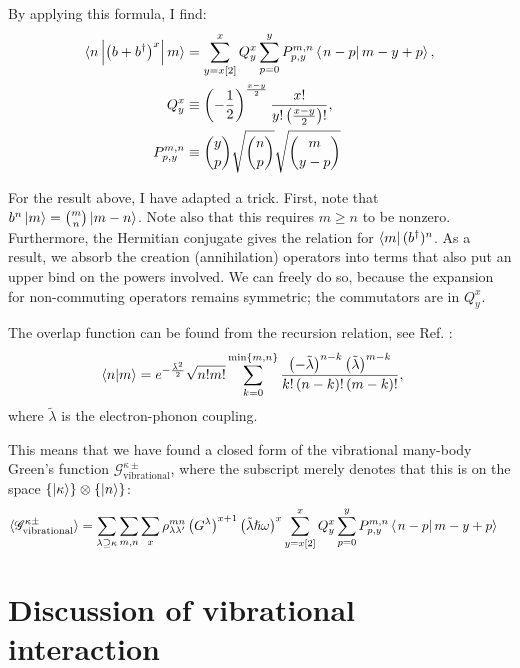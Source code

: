 By applying this formula, I find:
\begin{align*}
\braket{n \left| \left(b+b^\dagger\right)^x \right| m}&= \sum_{y=x[2]}^x Q^x_y \sum_{p=0}^{y} P^{m,n}_{p,y} \braket{\left. n-p \right| m-y+p}, \\
Q^x_y&\equiv \left(-\frac{1}{2}\right)^{\frac{x-y}{2}} \frac{ x! }{ y! \left(\frac{x-y}{2}\right)!},\\
P_{p,y}^{m,n} &\equiv \binom{y}{p} \sqrt{ \binom{n}{p}} \sqrt{\binom{m}{y-p}}
\end{align*}

For the result above, I have adapted a trick. First, note that $b^n \ket{m} = \binom{m}{n} \ket{m-n}$. Note also that this requires $m\geq n$ to be nonzero. Furthermore, the Hermitian conjugate gives the relation for $\bra{m} (b^\dagger)^n$. As a result, we absorb the creation (annihilation) operators into terms that also put an upper bind on the powers involved. We can freely do so, because the expansion for non-commuting operators remains symmetric; the commutators are in $Q^x_y$. 


The overlap function can be found from the recursion relation, see Ref. \cite{kaspermothpoulsen}:
\begin{align*}
\braket{n|m} &= e^{-\frac{\tilde{\lambda}^2}{2}} \sqrt{n! m!} \sum_{k=0}^{ \text{min}\left\{ m, n \right\}} \frac{ \left(-\tilde{\lambda}\right)^{n-k} \left(\tilde{\lambda}\right)^{m-k}}{ k! \left( n -k\right)! \left( m - k \right)!},
\end{align*} 
where $\tilde{\lambda}$ is the electron-phonon coupling.

This means that we have found a closed form of the vibrational many-body Green's function $\mathscr{G}^{\kappa\pm}_\text{vibrational}$, where the subscript merely denotes that this is on the space $\left\{\ket{\kappa}\right\} \otimes \left\{\ket{n}\right\}$:
\begin{align}
\braket{\mathscr{G}^{\kappa\pm}_\text{vibrational}}&= \sum_{\lambda\supseteq \kappa} \sum_{m,n} \sum_x\rho_{\lambda\lambda^\prime}^{mn}  \left(G^\lambda \right)^{x+1} \left(\tilde{\lambda}\hslash\omega\right)^x
 \sum_{y=x[2]}^x Q^x_y \sum_{p=0}^{y} P^{m,n}_{p,y} \braket{\left. n-p \right| m-y+p} \label{eq:vibgf}
\end{align}

\section{Discussion of vibrational interaction}
\label{sec:phononicdiscussion}

